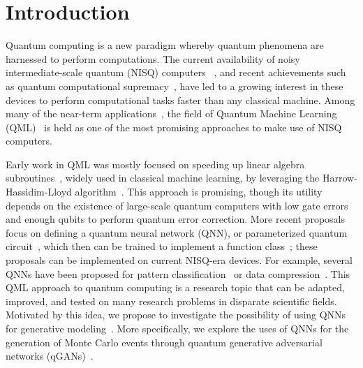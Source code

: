 \documentclass[twocolumn,preprintnumbers,superscriptaddress]{revtex4-2}
\begin{document}
\maketitle

\section{Introduction}

Quantum computing is a new paradigm whereby quantum phenomena are harnessed to perform computations. The current availability of noisy intermediate-scale quantum (NISQ) computers ~\cite{nisq}, and recent achievements such as quantum computational supremacy~\cite{supremacy, zhong2020quantum}, have led to a growing interest in these devices to perform computational tasks faster than any classical machine. Among many of the near-term applications~\cite{cerezo2021variational, bharti2021noisy}, the field of Quantum Machine Learning (QML)~\cite{biamonte2017quantum, schuld2018supervised} is held as one of the most promising approaches to make use of NISQ computers.

Early work in QML was mostly focused on speeding up linear algebra subroutines~\cite{wiebe2012quantum, lloyd:2013ml, Rebentrost:2014svm, kerenidis2020quantum}, widely used in classical machine learning, by leveraging the Harrow-Hassidim-Lloyd
algorithm~\cite{harrow2009quantum}. This approach is promising, though its utility depends on the existence of large-scale quantum computers with low gate errors and enough qubits to perform quantum error correction. More recent proposals focus on defining a quantum neural network (QNN), or parameterized quantum circuit~\cite{benedetti2019parameterized, sim2019expressibility, bravo2020scaling, larocca2021theory}, which then can be trained to implement a function class~\cite{schuld2021effect, goto2021universal, perez2021one}; these proposals can be implemented on current NISQ-era devices. For example, several QNNs have been proposed for pattern classification~\cite{havlivcek2019supervised, Schuld:2020circuit, perezsalinas:2020reuploading, dutta2021realization} or data compression~\cite{romero2017quantum, pepper2019experimental, bravo2021quantum, cao2021noise}. This QML approach to quantum computing is a research topic that can be adapted, improved, and tested on many research problems in disparate scientific fields. Motivated by this idea, we propose to investigate the possibility of using QNNs for generative modeling~\cite{benedetti2019generative, hamilton2019generative, coyle2020born}. More specifically, we explore the uses of QNNs for the generation of Monte Carlo events through quantum generative adversarial networks (qGANs)~\cite{dallaire2018quantum, lloyd2018quantum}.
\end{document}
